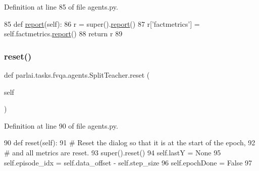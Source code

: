 Definition at line 85 of file agents.\+py.


\begin{DoxyCode}
85     \textcolor{keyword}{def }\hyperlink{namespaceprojects_1_1convai2_1_1eval__f1_a01a47b9c08dad189837a51f085defc45}{report}(self):
86         r = super().\hyperlink{namespaceprojects_1_1convai2_1_1eval__f1_a01a47b9c08dad189837a51f085defc45}{report}()
87         r[\textcolor{stringliteral}{'factmetrics'}] = self.factmetrics.\hyperlink{namespaceprojects_1_1convai2_1_1eval__f1_a01a47b9c08dad189837a51f085defc45}{report}()
88         \textcolor{keywordflow}{return} r
89 
\end{DoxyCode}
\mbox{\label{classparlai_1_1tasks_1_1fvqa_1_1agents_1_1SplitTeacher_a182054c66ca15095740b9c03dad2a4b9}} 
\subsubsection{\texorpdfstring{reset()}{reset()}}
{\footnotesize\ttfamily def parlai.\+tasks.\+fvqa.\+agents.\+Split\+Teacher.\+reset (\begin{DoxyParamCaption}\item[{}]{self }\end{DoxyParamCaption})}



Definition at line 90 of file agents.\+py.


\begin{DoxyCode}
90     \textcolor{keyword}{def }reset(self):
91         \textcolor{comment}{# Reset the dialog so that it is at the start of the epoch,}
92         \textcolor{comment}{# and all metrics are reset.}
93         super().reset()
94         self.lastY = \textcolor{keywordtype}{None}
95         self.episode\_idx = self.data\_offset - self.step\_size
96         self.epochDone = \textcolor{keyword}{False}
97 
\end{DoxyCode}
\mbox{\label{classparlai_1_1tasks_1_1fvqa_1_1agents_1_1SplitTeacher_a21e5cdbe5de45eee5098ffcbd0d85151}} 
